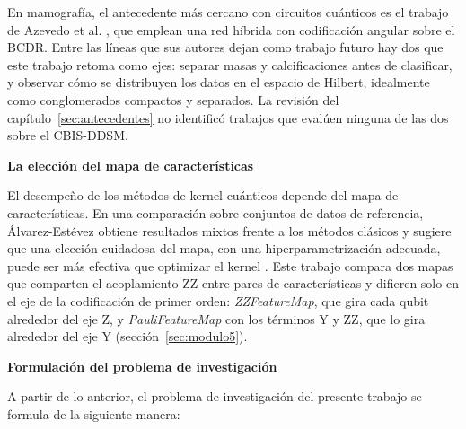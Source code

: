 En mamografía, el antecedente más cercano con circuitos cuánticos es el trabajo de Azevedo et al.
\cite{Azevedo2022QuantumTransfer}, que emplean una red híbrida con codificación angular sobre el
BCDR. Entre las líneas que sus autores dejan como trabajo futuro hay dos que este trabajo retoma como ejes: separar masas y
calcificaciones antes de clasificar, y observar cómo se distribuyen los datos en el espacio de
Hilbert, idealmente como conglomerados compactos y separados. La revisión del
capítulo~\ref{sec:antecedentes} no identificó trabajos que evalúen ninguna de las dos sobre el
CBIS-DDSM.

\textbf{La elección del mapa de características}

El desempeño de los métodos de kernel cuánticos depende del mapa de características. En una
comparación sobre conjuntos de datos de referencia, Álvarez-Estévez obtiene resultados mixtos
frente a los métodos clásicos y sugiere que una elección cuidadosa del mapa, con una
hiperparametrización adecuada, puede ser más efectiva que optimizar el kernel
\cite{AlvarezEstevez2024QuantumKernelBench}. Este trabajo compara dos mapas que comparten el
acoplamiento ZZ entre pares de características y difieren solo en el eje de la codificación de
primer orden: \textit{ZZFeatureMap}, que gira cada qubit alrededor del eje Z, y
\textit{PauliFeatureMap} con los términos Y y ZZ, que lo gira alrededor del eje Y
(sección~\ref{sec:modulo5}).

\textbf{Formulación del problema de investigación}

A partir de lo anterior, el problema de investigación del presente trabajo se formula de la
siguiente manera:

